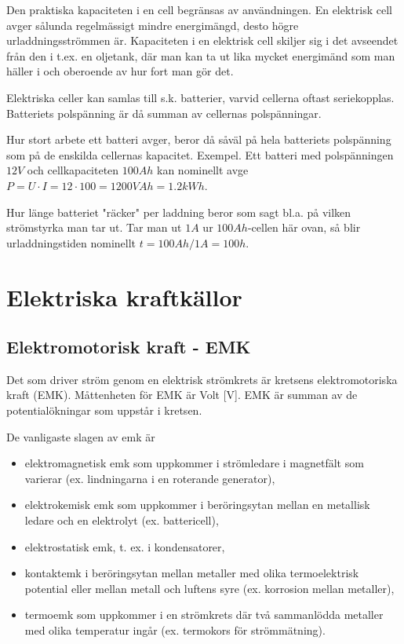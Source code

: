 Den praktiska kapaciteten i en cell begränsas av användningen. En elektrisk cell
avger sålunda regelmässigt mindre energimängd, desto högre urladdningsströmmen
är. Kapaciteten i en elektrisk cell skiljer sig i det avseendet från den i t.ex. en
oljetank, där man kan ta ut lika mycket energimänd som man häller i och oberoende av hur
fort man gör det.


Elektriska celler kan samlas till s.k. batterier, varvid cellerna oftast seriekopplas.
Batteriets polspänning är då summan av cellernas polspänningar.

Hur stort arbete ett batteri avger, beror då såväl på hela batteriets polspänning som på
de enskilda cellernas kapacitet.
Exempel.
Ett batteri med polspänningen $12 V$ och cellkapaciteten $100 Ah$ kan nominellt avge
$P = U \cdot I = 12 \cdot 100 = 1200 VAh = 1.2kWh$.

Hur länge batteriet "räcker" per laddning beror som sagt bl.a. på vilken strömstyrka
man tar ut. Tar man ut $1 A$ ur $100 Ah$-cellen här ovan, så blir urladdningstiden
nominellt $t = 100 Ah/1 A = 100 h$.

\cleardoublepage

\section{Elektriska kraftkällor}

\subsection{Elektromotorisk kraft - EMK}

Det som driver ström genom en elektrisk strömkrets är kretsens elektromotoriska kraft
(EMK).
Måttenheten för EMK är Volt [V]. EMK är summan av de potentialökningar som uppstår i
kretsen.

De vanligaste slagen av emk är
\begin{itemize}
\item elektromagnetisk emk som uppkommer i
strömledare i magnetfält som varierar
(ex. lindningarna i en roterande generator),
\item elektrokemisk emk som uppkommer i
beröringsytan mellan en metallisk ledare
och en elektrolyt (ex. battericell),
\item elektrostatisk emk, t. ex. i kondensatorer,
\item kontaktemk i beröringsytan mellan metaller med olika termoelektrisk potential
eller mellan metall och luftens syre (ex.
korrosion mellan metaller),
\item termoemk som uppkommer i en strömkrets där två sammanlödda metaller med
olika temperatur ingår (ex. termokors för
strömmätning).
\end{itemize}


